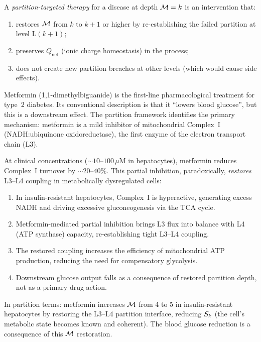 \begin{definition}
\label{def:partition_therapy}
A \emph{partition-targeted therapy} for a disease at depth $\mathcal{M} = k$ is
an intervention that:
\begin{enumerate}[label=(\roman*)]
  \item restores $\mathcal{M}$ from $k$ to $k+1$ or higher by re-establishing
        the failed partition at level L$(k+1)$;
  \item preserves $Q_{\mathrm{net}}$ (ionic charge homeostasis) in the
        process;
  \item does not create new partition breaches at other levels (which
        would cause side effects).
\end{enumerate}
\end{definition}

\begin{example}
\label{ex:metformin}
Metformin (1,1-dimethylbiguanide) is the first-line pharmacological treatment
for type~2 diabetes. Its conventional description is that it ``lowers blood
glucose'', but this is a downstream effect. The partition framework identifies
the primary mechanism: metformin is a mild inhibitor of mitochondrial Complex~I
(NADH:ubiquinone oxidoreductase), the first enzyme of the electron transport
chain (L3).

At clinical concentrations ($\sim 10$--$100\,\mu\mathrm{M}$ in hepatocytes),
metformin reduces Complex~I turnover by $\sim 20\text{--}40\%$. This
partial inhibition, paradoxically, \emph{restores} L3--L4 coupling in
metabolically dysregulated cells:
\begin{enumerate}[label=(\roman*)]
  \item In insulin-resistant hepatocytes, Complex~I is hyperactive,
        generating excess NADH and driving excessive gluconeogenesis via
        the TCA cycle.
  \item Metformin-mediated partial inhibition brings L3 flux into balance
        with L4 (ATP synthase) capacity, re-establishing tight L3--L4 coupling.
  \item The restored coupling increases the efficiency of mitochondrial ATP
        production, reducing the need for compensatory glycolysis.
  \item Downstream glucose output falls as a consequence of restored
        partition depth, not as a primary drug action.
\end{enumerate}
In partition terms: metformin increases $\mathcal{M}$ from 4 to 5 in
insulin-resistant hepatocytes by restoring the L3--L4 partition interface,
reducing $S_k$ (the cell's metabolic state becomes known and coherent).
The blood glucose reduction is a consequence of this $\mathcal{M}$ restoration.
\end{example}

